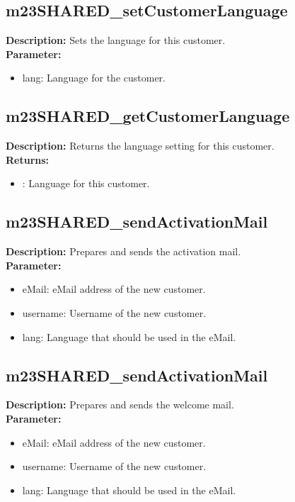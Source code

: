 \subsection{m23SHARED\_setCustomerLanguage}
\textbf{Description:} Sets the language for this customer.\\
\textbf{Parameter:}
\begin{itemize}
\item lang: Language for the customer.
\end{itemize}

\subsection{m23SHARED\_getCustomerLanguage}
\textbf{Description:} Returns the language setting for this customer.\\
\textbf{Returns:}
\begin{itemize}
\item : Language for this customer.
\end{itemize}

\subsection{m23SHARED\_sendActivationMail}
\textbf{Description:} Prepares and sends the activation mail.\\
\textbf{Parameter:}
\begin{itemize}
\item eMail: eMail address of the new customer.
\item username: Username of the new customer.
\item lang: Language that should be used in the eMail.
\end{itemize}

\subsection{m23SHARED\_sendActivationMail}
\textbf{Description:} Prepares and sends the welcome mail.\\
\textbf{Parameter:}
\begin{itemize}
\item eMail: eMail address of the new customer.
\item username: Username of the new customer.
\item lang: Language that should be used in the eMail.
\end{itemize}

